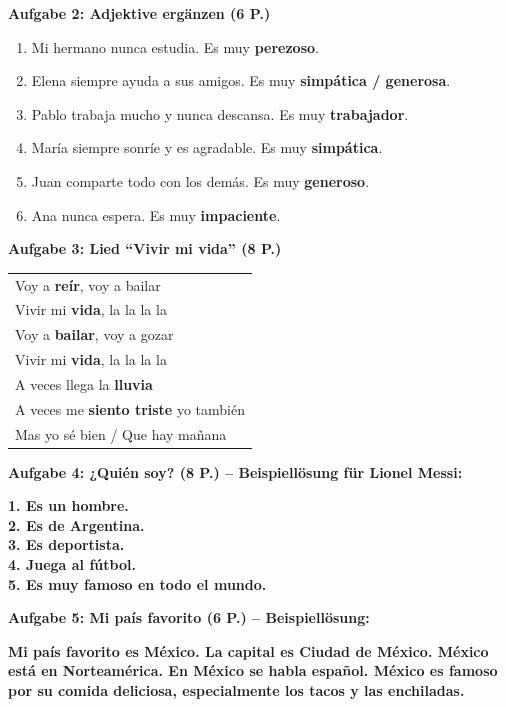 \documentclass[11pt,a4paper]{article}
\newcommand{\lsg}[1]{\textcolor{loesung}{\textbf{#1}}}
\begin{document}
\begin{gruppenbox}
\vspace{0.5em}

\textbf{Aufgabe 2: Adjektive ergänzen (6 P.)}
\begin{enumerate}[label=\alph*), leftmargin=2em, nosep]
    \item Mi hermano nunca estudia. Es muy \lsg{perezoso}.
    \item Elena siempre ayuda a sus amigos. Es muy \lsg{simpática / generosa}.
    \item Pablo trabaja mucho y nunca descansa. Es muy \lsg{trabajador}.
    \item María siempre sonríe y es agradable. Es muy \lsg{simpática}.
    \item Juan comparte todo con los demás. Es muy \lsg{generoso}.
    \item Ana nunca espera. Es muy \lsg{impaciente}.
\end{enumerate}

\vspace{0.5em}

\textbf{Aufgabe 3: Lied ``Vivir mi vida'' (8 P.)}

\begin{tabularx}{\textwidth}{@{}|X|@{}}
\hline
Voy a \lsg{reír}, voy a bailar \\
Vivir mi \lsg{vida}, la la la la \\
Voy a \lsg{bailar}, voy a gozar \\
Vivir mi \lsg{vida}, la la la la \\[0.3em]
A veces llega la \lsg{lluvia} \\
A veces me \lsg{siento triste} yo también \\
Mas yo sé bien / Que hay mañana \\
\hline
\end{tabularx}

\vspace{0.5em}

\textbf{Aufgabe 4: ¿Quién soy? (8 P.) -- Beispiellösung für Lionel Messi:}

\lsg{1. Es un hombre.}\\
\lsg{2. Es de Argentina.}\\
\lsg{3. Es deportista.}\\
\lsg{4. Juega al fútbol.}\\
\lsg{5. Es muy famoso en todo el mundo.}

\vspace{0.5em}

\textbf{Aufgabe 5: Mi país favorito (6 P.) -- Beispiellösung:}

\lsg{Mi país favorito es México. La capital es Ciudad de México. México está en Norteamérica. En México se habla español. México es famoso por su comida deliciosa, especialmente los tacos y las enchiladas.}

\end{gruppenbox}
\end{document}
